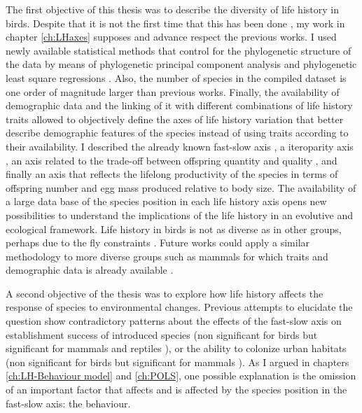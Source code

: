 The first objective of this thesis was to describe the diversity of life
history in birds. Despite that it is not the first time that this has been done
\citep{Saether1987,Gaillard1989,Saether2000,Jeschke2009}, my work in
chapter \ref{ch:LHaxes} supposes and advance respect the previous works. I used
newly available statistical methods that control for the phylogenetic structure
of the data by means of phylogenetic principal component analysis
\citep{Revell2009a} and phylogenetic least square regressions \citep{Ho2014}.
Also, the number of species in the compiled dataset is one order of magnitude
larger than previous works. Finally, the availability of demographic data and
the linking of it with different combinations of life history traits allowed to
objectively define the axes of life history variation that better describe
demographic features of the species instead of using traits according to their
availability.
I described the already known fast-slow axis
\citep{Stearns1983a,Saether1987,Gaillard1989,Oli2004,Dobson2007,Jeschke2009},
a iteroparity axis \citep{Gaillard1989}, an axis related to the trade-off
between offspring quantity and quality
\citep{Promislow1990,Bielby2007,Dobson2007}, and finally an axis that reflects
the lifelong productivity of the species in terms of offspring number and egg
mass produced relative to body size.
The availability of a large data base of the species position in each life
history axis opens new possibilities to understand the implications of the life
history in an evolutive and ecological framework.
Life history in birds is not as diverse as in other groups, perhaps due to the
fly constraints \citep{Gaillard1989,Healy2014}.
Future works could apply a similar methodology to more diverse groups such as
mammals for which traits and demographic data is already available
\citep{Myhrvold2015,Salguero-Gomez2016}.

\bigskip

A second objective of the thesis was to explore how life history affects the
response of species to environmental changes. Previous attempts to elucidate
the question show contradictory patterns about the effects of the fast-slow axis
on establishment success of introduced species (non significant for birds
\citep{Blackburn2009a,Sol2012a} but significant for mammals and reptiles
\citep{Capellini2015,Allen2017}), or the ability to colonize urban habitats
(non significant for birds \citep{Sol2014} but significant for mammals
\citep{Santini2019}).
As I argued in chapters \ref{ch:LH-Behaviour model} and \ref{ch:POLS}, one
possible explanation is the omission of an important factor that affects and
is affected by the species position in the fast-slow axis: the behaviour.

